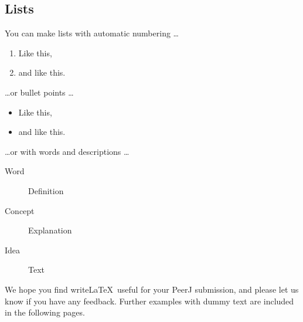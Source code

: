 \documentclass[fleqn,10pt]{wlpeerj}
\begin{document}
\subsection*{Lists}

You can make lists with automatic numbering \dots

\begin{enumerate}[noitemsep] 
	\item Like this,
	\item and like this.
\end{enumerate}
\dots or bullet points \dots
\begin{itemize}[noitemsep] 
	\item Like this,
	\item and like this.
\end{itemize}
\dots or with words and descriptions \dots
\begin{description}
	\item[Word] Definition
	\item[Concept] Explanation
	\item[Idea] Text
\end{description}

We hope you find write\LaTeX\ useful for your PeerJ submission, and please let us know if you have any feedback. Further examples with dummy text are included in the following pages.



\end{document}
